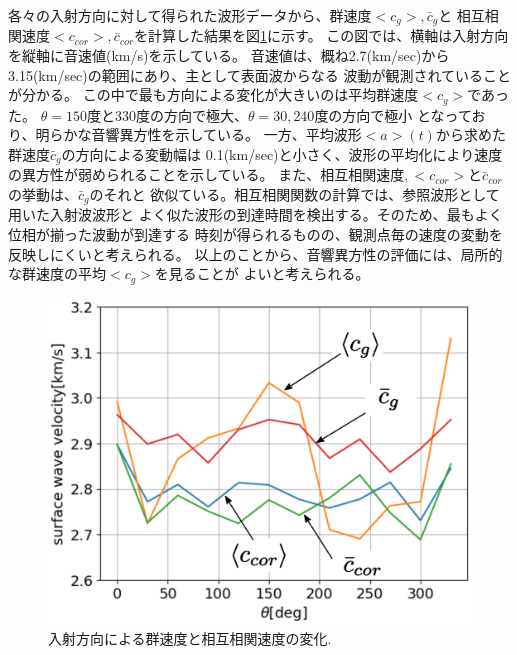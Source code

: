 各々の入射方向に対して得られた波形データから、群速度$<c_g>,\bar c_g$と
相互相関速度$<c_{cor}>, \bar c_{cor}$を計算した結果を図\ref{fig:fig12}に示す。
この図では、横軸は入射方向を縦軸に音速値(km/s)を示している。
音速値は、概ね2.7(km/sec)から3.15(km/sec)の範囲にあり、主として表面波からなる
波動が観測されていることが分かる。
この中で最も方向による変化が大きいのは平均群速度$<c_g>$であった。
$\theta=150$度と330度の方向で極大、$\theta=30,240$度の方向で極小
となっており、明らかな音響異方性を示している。
一方、平均波形$<a>(t)$から求めた群速度$\bar c_g$の方向による変動幅は
0.1(km/sec)と小さく、波形の平均化により速度の異方性が弱められることを示している。
また、相互相関速度$,<c_{cor}>$と$\bar{c}_{cor}$の挙動は、$\bar c_g$のそれと
欲似ている。相互相関関数の計算では、参照波形として用いた入射波波形と
よく似た波形の到達時間を検出する。そのため、最もよく位相が揃った波動が到達する
時刻が得られるものの、観測点毎の速度の変動を反映しにくいと考えられる。
以上のことから、音響異方性の評価には、局所的な群速度の平均$<c_g>$を見ることが
よいと考えられる。
\begin{figure}[h]
	\begin{center}
	\includegraphics[width=0.8\linewidth]{Figs/fig12.eps} 
	\end{center}
	\caption{
		入射方向による群速度と相互相関速度の変化.
	} 
	\label{fig:fig12}
\end{figure}

